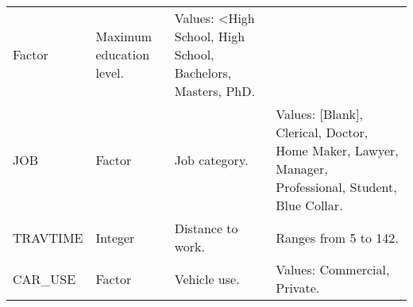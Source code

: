 \documentclass[]{article}
\begin{document}
\begin{longtable}[]{@{}llll@{}}
\begin{minipage}[t]{0.12\columnwidth}
Factor\strut
\end{minipage} & \begin{minipage}[t]{0.28\columnwidth}\raggedright\strut
Maximum education level.\strut
\end{minipage} & \begin{minipage}[t]{0.28\columnwidth}\raggedright\strut
Values: \textless{}High School, High School, Bachelors, Masters,
PhD.\strut
\end{minipage}\tabularnewline
\begin{minipage}[t]{0.16\columnwidth}\raggedright\strut
JOB\strut
\end{minipage} & \begin{minipage}[t]{0.12\columnwidth}\raggedright\strut
Factor\strut
\end{minipage} & \begin{minipage}[t]{0.28\columnwidth}\raggedright\strut
Job category.\strut
\end{minipage} & \begin{minipage}[t]{0.28\columnwidth}\raggedright\strut
Values: {[}Blank{]}, Clerical, Doctor, Home Maker, Lawyer, Manager,
Professional, Student, Blue Collar.\strut
\end{minipage}\tabularnewline
\begin{minipage}[t]{0.16\columnwidth}\raggedright\strut
TRAVTIME\strut
\end{minipage} & \begin{minipage}[t]{0.12\columnwidth}\raggedright\strut
Integer\strut
\end{minipage} & \begin{minipage}[t]{0.28\columnwidth}\raggedright\strut
Distance to work.\strut
\end{minipage} & \begin{minipage}[t]{0.28\columnwidth}\raggedright\strut
Ranges from 5 to 142.\strut
\end{minipage}\tabularnewline
\begin{minipage}[t]{0.16\columnwidth}\raggedright\strut
CAR\_USE\strut
\end{minipage} & \begin{minipage}[t]{0.12\columnwidth}\raggedright\strut
Factor\strut
\end{minipage} & \begin{minipage}[t]{0.28\columnwidth}\raggedright\strut
Vehicle use.\strut
\end{minipage} & \begin{minipage}[t]{0.28\columnwidth}\raggedright\strut
Values: Commercial, Private.\strut

\end{minipage}
\end{longtable}
\end{document}
